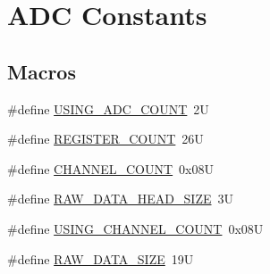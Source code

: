 \hypertarget{group___a_d_c_const}{\section{A\-D\-C Constants}
\label{group___a_d_c_const}
}
\subsection*{Macros}
\begin{DoxyCompactItemize}
\item 
\#define \hyperlink{group___a_d_c_const_gaca9e5377ccfd63366108499355649849}{U\-S\-I\-N\-G\-\_\-\-A\-D\-C\-\_\-\-C\-O\-U\-N\-T}~2\-U
\item 
\#define \hyperlink{group___a_d_c_const_ga872bdec8b3471262a8a0131d7dc0fc0d}{R\-E\-G\-I\-S\-T\-E\-R\-\_\-\-C\-O\-U\-N\-T}~26\-U
\item 
\#define \hyperlink{group___a_d_c_const_ga29e42927003b0aa647ee45965f4ccb07}{C\-H\-A\-N\-N\-E\-L\-\_\-\-C\-O\-U\-N\-T}~0x08\-U
\item 
\#define \hyperlink{group___a_d_c_const_ga376abce49920ac1af18c1bba3b2dd853}{R\-A\-W\-\_\-\-D\-A\-T\-A\-\_\-\-H\-E\-A\-D\-\_\-\-S\-I\-Z\-E}~3\-U
\item 
\#define \hyperlink{group___a_d_c_const_gadee91c7f97e44412335dbe4713a29613}{U\-S\-I\-N\-G\-\_\-\-C\-H\-A\-N\-N\-E\-L\-\_\-\-C\-O\-U\-N\-T}~0x08\-U
\item 
\#define \hyperlink{group___a_d_c_const_ga324659f8cc7fd46c718a4b405c0753d6}{R\-A\-W\-\_\-\-D\-A\-T\-A\-\_\-\-S\-I\-Z\-E}~19\-U
\end{DoxyCompactItemize}
